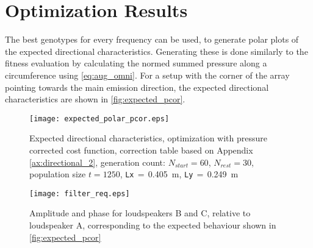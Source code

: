 \section{Optimization Results}\label{sec:opt_result}
The best genotypes for every frequency can be used, to generate polar plots of the expected directional characteristics. Generating these is done similarly to the fitness evaluation by calculating the normed summed pressure along a circumference using \autoref{eq:aug_omni}.
For a setup with the corner of the array pointing towards the main emission direction, the expected directional characteristics are shown in \autoref{fig:expected_pcor}.\\
\begin{figure}[H]
	\centering
	\texttt{[image: expected\_polar\_pcor.eps]}
	\caption{Expected directional characteristics, optimization with pressure corrected cost function, correction table based on Appendix \ref{ax:directional_2}, generation count: $N_{start}=60$, $N_{rest}=30$, population size $t=1250$, \textcolor{green3}{\texttt{Lx}}\,$=$\,\SI{0.405}{\meter}, \textcolor{green3}{\texttt{Ly}}\,$=\,$\SI{0.249}{\meter}}
		\label{fig:expected_pcor}
\end{figure}
\begin{figure}[H]
	\centering
	\texttt{[image: filter\_req.eps]}
	\caption{Amplitude and phase for loudspeakers B and C, relative to loudspeaker A, corresponding to the expected behaviour shown in \autoref{fig:expected_pcor}}
		\label{fig:filter_req}
\end{figure}

